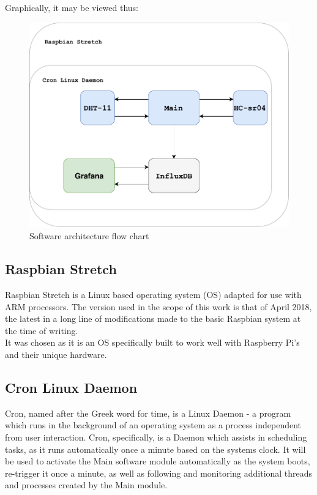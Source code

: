 \documentclass[twoside]{ctuthesis}
\theoremstyle{plain}
\theoremstyle{definition}
\theoremstyle{note}
\begin{document}
Graphically, it may be viewed thus:

\begin{figure}[H]
	\centering
	\includegraphics[width = \textwidth]{System_architecture}
	\caption{Software architecture flow chart}
\end{figure}

\subsection{Raspbian Stretch}
Raspbian Stretch is a Linux based operating system (OS) adapted for use with ARM processors. The version used in the scope of this work is that of April 2018, the latest in a long line of modifications made to the basic Raspbian system at the time of writing.\\
It was chosen as it is an OS specifically built to work well with Raspberry Pi's and their unique hardware.

\subsection{Cron Linux Daemon}
Cron, named after the Greek word for time, is a Linux Daemon - a program which runs in the background of an operating system as a process independent from user interaction. Cron, specifically, is a Daemon which assists in scheduling tasks, as it runs automatically once a minute based on the systems clock. It will be used to activate the Main software module automatically as the system boots, re-trigger it once a minute, as well as following and monitoring additional threads and processes created by the Main module.
\end{document}
